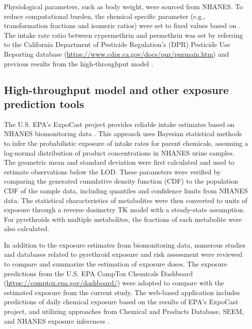 \documentclass[toxics,article,submit,pdftex,moreauthors]{Definitions/mdpi}
\begin{document}
Physiological parameters, such as body weight, were sourced from NHANES.
To reduce computational burden, the chemical specific parameter (e.g.,
transformation fractions and isomeric ratios) were set to fixed values
based on \citet{quindroit2019estimating}. The intake rate ratio between
cypermethrin and permethrin was set by referring to the California
Department of Pesticide Regulation's (DPR) Pesticide Use Reporting
database (\url{https://www.cdpr.ca.gov/docs/pur/purmain.htm}) and
previous results from the high-throughput model
\citep{stanfield2022bayesian}.

\subsection{High-throughput model and other exposure prediction
tools}\label{high-throughput-model-and-other-exposure-prediction-tools}

The U.S. EPA's ExpoCast project provides reliable intake estimates based
on NHANES biomonitoring data \citep{wambaugh2013high}. This approach
uses Bayesian statistical methods to infer the probabilistic exposure of
intake rates for parent chemicals, assuming a log-normal distribution of
product concentrations in NHANES urine samples. The geometric mean and
standard deviation were first calculated and used to estimate
observations below the LOD. These parameters were verified by comparing
the generated cumulative density function (CDF) to the population CDF of
the sample data, including quantiles and confidence limits from NHANES
data. The statistical characteristics of metabolites were then converted
to units of exposure through a reverse dosimetry TK model with a
steady-state assumption. For pyrethroids with multiple metabolites, the
fractions of each metabolite were also calculated.

In addition to the exposure estimates from biomonitoring data, numerous
studies and databases related to pyrethroid exposure and risk assessment
were reviewed to compare and summarize the estimation of exposure doses.
The exposure predictions from the U.S. EPA CompTox Chemicals Dashboard
(\url{https://comptox.epa.gov/dashboard/}) were adopted to compare with
the estimated exposure from the current study. The web-based application
includes predictions of daily chemical exposure based on the results of
EPA's ExpoCast project, and utilizing approaches from Chemical and
Products Database, SEEM, and NHANES exposure inferences
\citep{dionisio2018chemical, wambaugh2022exposure}.
\end{document}
